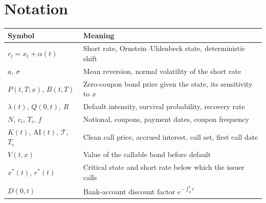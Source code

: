 \documentclass[11pt,a4paper]{article}
\newcommand{\AI}{\mathrm{AI}}
\begin{document}
\appendix
\section{Notation}
\begin{center}
\begin{tabular}{@{}ll@{}}
\toprule
Symbol & Meaning \\
\midrule
$r_t = x_t + \alpha(t)$ & Short rate, Ornstein--Uhlenbeck state, deterministic shift \\
$a$, $\sigma$ & Mean reversion, normal volatility of the short rate \\
$P(t,T;x)$, $B(t,T)$ & Zero-coupon bond price given the state, its sensitivity to $x$ \\
$\lambda(t)$, $Q(0,t)$, $R$ & Default intensity, survival probability, recovery rate \\
$N$, $c_i$, $T_i$, $f$ & Notional, coupons, payment dates, coupon frequency \\
$K(t)$, $\AI(t)$, $\mathcal{T}$, $T_c$ & Clean call price, accrued interest, call set, first call date \\
$V(t,x)$ & Value of the callable bond before default \\
$x^*(t)$, $r^*(t)$ & Critical state and short rate below which the issuer calls \\
$D(0,t)$ & Bank-account discount factor $e^{-\int_0^t r}$ \\
\bottomrule
\end{tabular}
\end{center}
\end{document}

